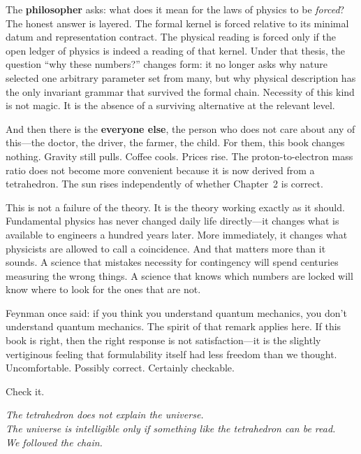 \documentclass[11pt,a4paper]{book}
\begin{document}
The \textbf{philosopher} asks: what does it mean for the laws of physics to be \emph{forced}? The honest answer is layered. The formal kernel is forced relative to its minimal datum and representation contract. The physical reading is forced only if the open ledger of physics is indeed a reading of that kernel. Under that thesis, the question ``why these numbers?'' changes form: it no longer asks why nature selected one arbitrary parameter set from many, but why physical description has the only invariant grammar that survived the formal chain. Necessity of this kind is not magic. It is the absence of a surviving alternative at the relevant level.

\medskip

And then there is the \textbf{everyone else}, the person who does not care about any of this---the doctor, the driver, the farmer, the child. For them, this book changes nothing. Gravity still pulls. Coffee cools. Prices rise. The proton-to-electron mass ratio does not become more convenient because it is now derived from a tetrahedron. The sun rises independently of whether Chapter~2 is correct.

This is not a failure of the theory. It is the theory working exactly as it should. Fundamental physics has never changed daily life directly---it changes what is available to engineers a hundred years later. More immediately, it changes what physicists are allowed to call a coincidence. And that matters more than it sounds. A science that mistakes necessity for contingency will spend centuries measuring the wrong things. A science that knows which numbers are locked will know where to look for the ones that are not.

\medskip

Feynman once said: if you think you understand quantum mechanics, you don't understand quantum mechanics. The spirit of that remark applies here. If this book is right, then the right response is not satisfaction---it is the slightly vertiginous feeling that formulability itself had less freedom than we thought. Uncomfortable. Possibly correct. Certainly checkable.

Check it.

\bigskip

\begin{center}
\textit{The tetrahedron does not explain the universe.}\\
\textit{The universe is intelligible only if something like the tetrahedron can be read.}\\
\textit{We followed the chain.}
\end{center}
\end{document}
